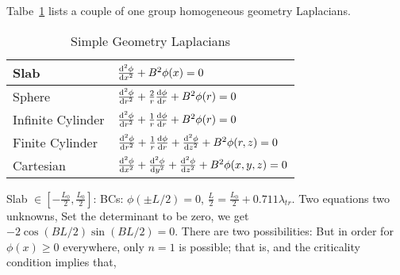 \documentclass{school-22.211-notes}
\begin{document}
Talbe~\ref{simple-geometry-laplacian} lists a couple of one group homogeneous geometry Laplacians. 
\begin{table}
  \centering
  \begin{tabular}{|l|l|} \hline
    Slab & $\frac{\mathrm{d}^{2}\phi}{\mathrm{d}x^{2}} + B^2 \phi(x) = 0$ \\ \hline
    Sphere & $\frac{\mathrm{d}^{2}\phi}{\mathrm{d}r^{2}} + \frac{2}{r} \frac{\mathrm{d}\phi}{\mathrm{d}r} + B^2 \phi(r) = 0$ \\ \hline
    Infinite Cylinder & $\frac{\mathrm{d}^{2}\phi}{\mathrm{d}r^{2}} + \frac{1}{r} \frac{\mathrm{d}\phi}{\mathrm{d}r} + B^2 \phi(r) = 0$ \\ \hline
    Finite Cylinder & $\frac{\mathrm{d}^{2}\phi}{\mathrm{d}r^{2}} + \frac{1}{r} \frac{\mathrm{d}\phi}{\mathrm{d}r} + \frac{\mathrm{d}^{2}\phi}{\mathrm{d}z^{2}} + B^2 \phi(r,z) = 0$ \\ \hline
    Cartesian & $\frac{\mathrm{d}^{2}\phi}{\mathrm{d}x^{2}} + \frac{\mathrm{d}^{2}\phi}{\mathrm{d}y^{2}} + \frac{\mathrm{d}^{2}\phi}{\mathrm{d}z^{2}} + B^2 \phi(x,y,z) = 0$ \\ \hline
  \end{tabular}
\caption{Simple Geometry Laplacians} \label{simple-geometry-laplacian}
\end{table}




\clearpage
{}
 Slab $\in  \left[- \frac{L_0}{2}, \frac{L_0}{2} \right]$:
BCs: $\phi(\pm L/2) = 0$, $\frac{L}{2} = \frac{L_0}{2} + 0.711 \lambda_{tr}$. Two equations two unknowns, 
  Set the determinant to be zero, we get $-2 \cos (BL/2) \sin (BL/2) = 0$. There are two possibilities: 
But in order for $\phi(x) \ge 0$ everywhere, only $n=1$ is possible; that is, 
and the criticality condition implies that, 
\end{document}
